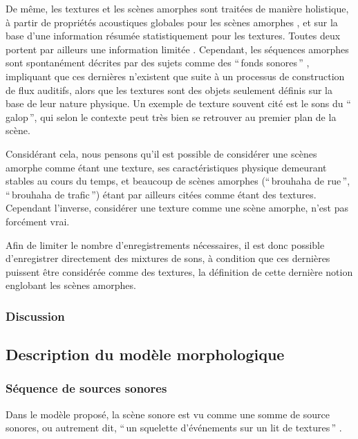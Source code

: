 De même, les textures et les scènes amorphes sont traitées de manière holistique, à partir de propriétés acoustiques globales pour les scènes amorphes \citep{dubois2006cognitive,maffiolo_caracterisation_1999}, et sur la base d'une information résumée statistiquement pour les textures\citep{mcdermott2013summary}. Toutes deux portent par ailleurs une information limitée \citep{saint1995classification,nelken2013ear}. Cependant, les séquences amorphes sont spontanément décrites par des sujets comme des ``\,fonds sonores\,'' \citep{maffiolo_caracterisation_1999,guastavino2006ideal}, impliquant que ces dernières n'existent que suite à un processus de construction de flux auditifs, alors que les textures sont des objets seulement définis sur la base de leur nature physique. Un exemple de texture souvent cité est le sons du ``\,galop\,'', qui selon le contexte peut très bien se retrouver au premier plan de la scène. 

Considérant cela, nous pensons qu'il est possible de considérer une scènes amorphe comme étant une texture, ses caractéristiques physique demeurant stables au cours du temps, et beaucoup de scènes amorphes (``\,brouhaha de rue\,'', ``\,brouhaha de trafic\,'') étant par ailleurs citées comme étant des textures. Cependant l'inverse, considérer une texture comme une scène amorphe, n'est pas forcément vrai.

Afin de limiter le nombre d'enregistrements nécessaires, il est donc possible d'enregistrer directement des mixtures de sons, à condition que ces dernières puissent être considérée comme des textures, la définition de cette dernière notion englobant les scènes amorphes.

\subsubsection{Discussion}

\subsection{Description du modèle morphologique}


\subsubsection{Séquence de sources sonores}

Dans le modèle proposé, la scène sonore est vu comme une somme de source sonores, ou autrement dit, ``\,un squelette d'événements sur un lit de textures\,'' \citep{nelken2013ear}. 

